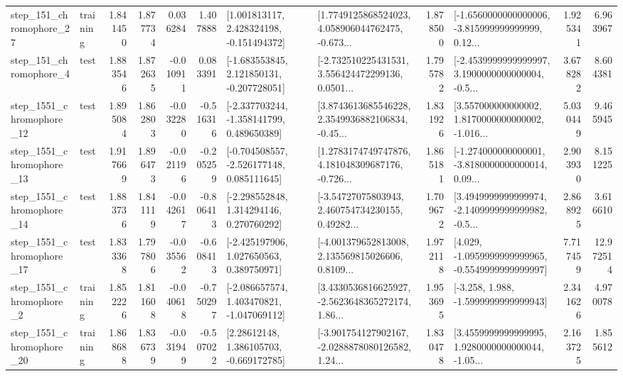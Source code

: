 \begin{tabular}{llrrrrllrlrr}
  step\_151\_chromophore\_27 &  training &      1.841450 &    1.877734 &      0.036284 &  1.407888 &    [1.001813117, 2.428324198, -0.151494372] &  [1.7749125868524023, 4.058906044762475, -0.673... &       1.878500 &  [-1.6560000000000006, -3.815999999999999, 0.12... &            1.925341 &          6.963967 \\
   step\_151\_chromophore\_4 &      test &      1.883546 &    1.872635 &     -0.010911 &  0.083391 &   [-1.683553845, 2.121850131, -0.207728051] &  [-2.732510225431531, 3.556424472299136, 0.0501... &       1.795782 &  [-2.4539999999999997, 3.1900000000000004, -0.5... &            3.678282 &          8.604381 \\
 step\_1551\_chromophore\_12 &      test &      1.895084 &    1.862803 &     -0.032280 & -0.516316 &   [-2.337703244, -1.358141799, 0.489650389] &  [3.8743613685546228, 2.3549936882106834, -0.45... &       1.831926 &  [3.557000000000002, 1.8170000000000002, -1.016... &            5.030449 &          9.465945 \\
 step\_1551\_chromophore\_13 &      test &      1.917669 &    1.896473 &     -0.021196 & -0.205259 &   [-0.704508557, -2.526177148, 0.085111645] &  [1.2783174749747876, 4.181048309687176, -0.726... &       1.865181 &  [-1.274000000000001, -3.8180000000000014, 0.09... &            2.903930 &          8.151225 \\
 step\_1551\_chromophore\_14 &      test &      1.883736 &    1.841119 &     -0.042617 & -0.806413 &    [-2.298552848, 1.314294146, 0.270760292] &  [-3.54727075803943, 2.460754734230155, 0.49282... &       1.709672 &  [3.4949999999999974, -2.1409999999999982, -0.5... &            2.868925 &          3.616610 \\
 step\_1551\_chromophore\_17 &      test &      1.833368 &    1.797806 &     -0.035562 & -0.608413 &    [-2.425197906, 1.027650563, 0.389750971] &  [-4.001379652813008, 2.135569815026606, 0.8109... &       1.972118 &  [4.029, -1.0959999999999965, -0.5549999999999997] &            7.717459 &         12.972514 \\
  step\_1551\_chromophore\_2 &  training &      1.852226 &    1.811608 &     -0.040618 & -0.750297 &   [-2.086657574, 1.403470821, -1.047069112] &  [3.4330536816625927, -2.5623648365272174, 1.86... &       1.953695 &               [-3.258, 1.988, -1.5999999999999943] &            2.341626 &          4.970078 \\
 step\_1551\_chromophore\_20 &  training &      1.868688 &    1.836739 &     -0.031949 & -0.507022 &     [2.28612148, 1.386105703, -0.669172785] &  [-3.901754127902167, -2.0288878080126582, 1.24... &       1.830478 &  [3.4559999999999995, 1.9280000000000044, -1.05... &            2.163725 &          1.855612 \\

\end{tabular}
